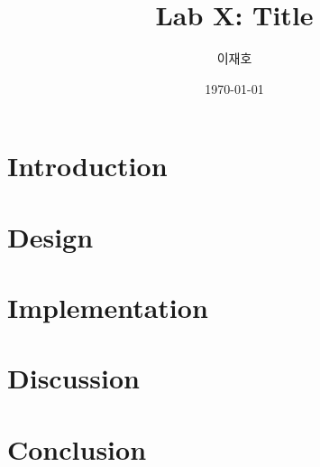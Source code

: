 \documentclass{myreport}
\title{Lab X: Title}
\author{이재호}
\date{\today}
\begin{document}
\maketitle
\section{Introduction}
\lipsum[1-2]

\section{Design}
\lipsum[3-5]

\section{Implementation}
\lipsum[6-8]

\section{Discussion}
\lipsum[9-10]

\section{Conclusion}
\lipsum[11]
\end{document}
